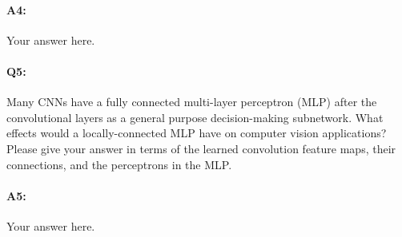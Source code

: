 \paragraph{A4:} Your answer here.





\pagebreak
\paragraph{Q5:} Many CNNs have a fully connected multi-layer perceptron (MLP) after the convolutional layers as a general purpose decision-making subnetwork. What effects would a locally-connected MLP have on computer vision applications? Please give your answer in terms of the learned convolution feature maps, their connections, and the perceptrons in the MLP.
\paragraph{A5:} Your answer here.








